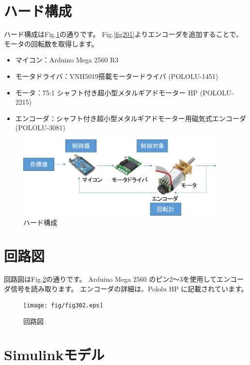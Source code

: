 \section{ハード構成}\label{ux30edux30dcux30c3ux30c8ux7af6ux6280ux5927ux4f1aux306eux6982ux8981}

ハード構成はFig.\ref{fig301}の通りです。
Fig.\ref{fig201}よりエンコーダを追加することで、モータの回転数を取得します。

\begin{itemize}
    \tightlist
    \item
    マイコン：Arduino Mega 2560 R3
    \item
    モータドライバ：VNH5019搭載モータードライバ (POLOLU-1451)
    \item
    モータ：75:1 シャフト付き超小型メタルギアドモーター HP (POLOLU-2215)
    \item
    エンコーダ：シャフト付き超小型メタルギアドモーター用磁気式エンコーダ (POLOLU-3081)
    \end{itemize}

\begin{figure}[htbp]
\centering
\includegraphics[width=300pt]{fig/fig301.eps}
\caption{ハード構成}
\label{fig301}
\end{figure}


\section{回路図}\label{ux69cbux60f3ux8a2dux8a08}

回路図はFig.\ref{fig302}の通りです。
Arduino Mega 2560 のピン2～3を使用してエンコーダ信号を読み取ります。
エンコーダの詳細は、Pololu HP \cite{pololu_HP_encoder} に記載されています。

\begin{figure}[htbp]
\centering
\texttt{[image: fig/fig302.eps]}
\caption{回路図}
\label{fig302}
\end{figure}


\section{Simulinkモデル}\label{ux5168ux4f53ux69cbux6210}

